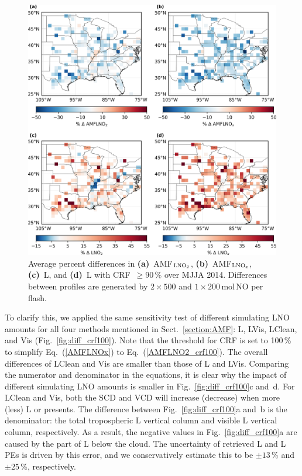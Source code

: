 \documentclass[amt]{copernicus}
\begin{document}
\begin{figure}[t]
    \includegraphics[width=12cm]{amt-2019-372-f10.png}
    \caption{Average percent differences in \textbf{(a)}~AMF$_{\chem{LNO_2}}$, \textbf{(b)}~AMF$_{\chem{LNO_\mathit{x}}}$, \textbf{(c)}~L, and \textbf{(d)}~L with CRF~$\geq 90$\,{\%} over MJJA 2014.
    Differences between profiles are generated by $2\times500$ and $1\times200$\,mol\,NO per flash.}
    \label{fig:simulation_diff}
\end{figure}
To clarify this, we applied the same sensitivity test of different simulating LNO amounts for all four methods mentioned in Sect.~\ref{section:AMF}: L, LVis, LClean, and Vis (Fig.~\ref{fig:diff_crf100}).
Note that the threshold for CRF is set to 100\,{\%} to simplify Eq.~(\ref{AMFLNOx}) to Eq.~(\ref{AMFLNO2_crf100}).
The overall differences of LClean and Vis are smaller than those of L and LVis.
Comparing the numerator and denominator in the equations, it is clear why the impact of different simulating LNO amounts is smaller in Fig.~\ref{fig:diff_crf100}c and~d.
For LClean and Vis, both the SCD and VCD will increase (decrease) when more (less) L or  presents.
The difference between Fig.~\ref{fig:diff_crf100}a and~b is the denominator: the total tropospheric L vertical column and visible L vertical column, respectively.
As a result, the negative values in Fig.~\ref{fig:diff_crf100}a are caused by the part of L below the cloud.
The uncertainty of retrieved L and L PEs is driven by this error, and we conservatively estimate this to be $\pm 13$\,{\%} and $\pm 25$\,{\%}, respectively.
\end{document}
